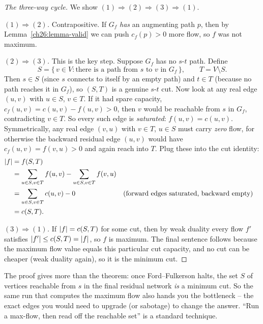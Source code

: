 \begin{proof}[The three-way cycle]
We show $(1)\Rightarrow(2) \Rightarrow (3) \Rightarrow (1)$.

\emph{$(1)\Rightarrow(2)$.} Contrapositive. If $G_f$ \emph{has} an augmenting
path $p$, then by Lemma~\ref{ch26:lemma-valid} we can push $c_f(p) > 0$ more
flow, so $f$ was not maximum.

\emph{$(2)\Rightarrow(3)$.} This is the key step. Suppose $G_f$ has no
$s$-$t$ path. Define
\[
  S = \{\, v \in V : \text{there is a path from } s \text{ to } v \text{ in } G_f \,\},
  \qquad T = V \setminus S.
\]
Then $s \in S$ (since $s$ connects to itself by an empty path) and $t \in T$ (because no path reaches it in $G_f$), so
$(S,T)$ is a genuine $s$-$t$ cut. Now look at any real edge $(u,v)$ with $u \in
S$, $v \in T$. If it had spare capacity, $c_f(u,v) = c(u,v) - f(u,v) > 0$, then
$v$ would be reachable from $s$ in $G_f$, contradicting $v \in T$. So every
such edge is \emph{saturated}: $f(u,v) = c(u,v)$. Symmetrically, any real edge
$(v,u)$ with $v \in T$, $u \in S$ must carry \emph{zero} flow, for otherwise
the backward residual edge $(u,v)$ would have $c_f(u,v) = f(v,u) > 0$ and again
reach into $T$. Plug these into the cut identity:
\begin{align*}
  \lvert f\rvert &= f(S,T) \\
          &= \sum_{u\in S, v\in T} f(u,v) - \sum_{u\in S, v\in T} f(v,u) \\
          &= \sum_{u\in S, v\in T} c(u,v) - 0 &&\text{(forward edges saturated, backward empty)} \\
          &= c(S,T).
\end{align*}

\emph{$(3)\Rightarrow(1)$.} If $\lvert f\rvert = c(S,T)$ for some cut, then by weak
duality every flow $f'$ satisfies $\lvert f'\rvert \le c(S,T) = \lvert f\rvert$, so $f$ is
maximum. The final sentence follows because the maximum flow value equals this
particular cut capacity, and no cut can be cheaper (weak duality again), so it
is the minimum cut.
\end{proof}

\begin{focusbox}
The proof gives more than the theorem: once Ford--Fulkerson halts, the set
$S$ of vertices reachable from $s$ in the final residual network \emph{is} a
minimum cut. So the same run that computes the maximum flow also hands you the
bottleneck -- the exact edges you would need to upgrade (or sabotage) to change
the answer. ``Run a max-flow, then read off the reachable set'' is a standard
technique.
\end{focusbox}

